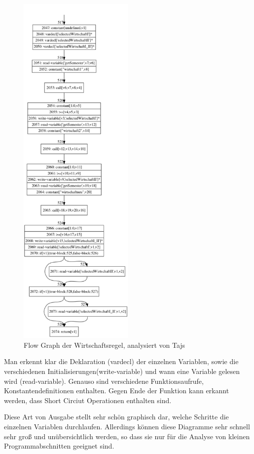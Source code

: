 \documentclass[ngerman]{article}
\begin{document}
\begin{figure}[h!]
\centering
\includegraphics[width=0.5\textwidth]{figures/tajs.pdf}
\caption{Flow Graph der Wirtschaftsregel, analysiert von Tajs}
\label{fig:tajs}
\end{figure}

Man erkennt klar die Deklaration (vardecl) der einzelnen Variablen, sowie die verschiedenen Initialisierungen(write-variable) und wann eine Variable gelesen wird (read-variable). Genauso sind verschiedene Funktionsaufrufe, Konstantendefinitionen enthalten.
Gegen Ende der Funktion kann erkannt werden, dass Short Circiut Operationen enthalten sind.

Diese Art von Ausgabe stellt sehr schön graphisch dar, welche Schritte die einzelnen Variablen durchlaufen. Allerdings können diese Diagramme sehr schnell sehr groß und unübersichtlich werden, so dass sie nur für die Analyse von kleinen Programmabschnitten geeignet sind.
\end{document}
